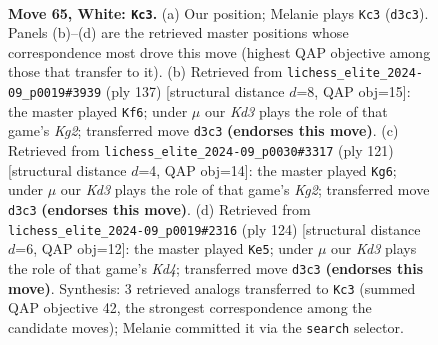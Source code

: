 \documentclass[11pt]{article}
\begin{document}
\clearpage

\begin{figure}[p]\centering
\begin{subfigure}{0.46\textwidth}\centering
\resizebox{\linewidth}{!}{%
\newchessgame
\chessboard[
  setfen={8/p6k/1p6/8/q1P5/3K4/8/8 w - - 2 65},
  showmover=false,
  pgfstyle=straightmove, color=movearrow, markmove={d3-c3}
]}
\caption{}
\end{subfigure}\hfill
\begin{subfigure}{0.46\textwidth}\centering
\resizebox{\linewidth}{!}{%
\newchessgame
\chessboard[
  setfen={2Q5/1P4k1/8/5p2/1K6/4P3/8/6B1 b - - 0 69},
  showmover=false,
  pgfstyle=straightmove, color=movearrow, markmove={g7-f6}
]}
\caption{}
\end{subfigure}
\\[4pt]
\begin{subfigure}{0.46\textwidth}\centering
\resizebox{\linewidth}{!}{%
\newchessgame
\chessboard[
  setfen={8/6k1/4Qp2/8/5PP1/8/6K1/8 b - - 1 61},
  showmover=false,
  pgfstyle=straightmove, color=movearrow, markmove={g7-g6}
]}
\caption{}
\end{subfigure}\hfill
\begin{subfigure}{0.46\textwidth}\centering
\resizebox{\linewidth}{!}{%
\newchessgame
\chessboard[
  setfen={6k1/5p2/2q4p/2P5/3K4/8/8/8 w - - 1 63},
  showmover=false,
  pgfstyle=straightmove, color=movearrow, markmove={d4-e5}
]}
\caption{}
\end{subfigure}
\caption{\textbf{Move 65, White: \texttt{Kc3}.} (a) Our position; Melanie plays \texttt{Kc3} (\texttt{d3c3}). Panels (b)--(d) are the retrieved master positions whose correspondence most drove this move (highest QAP objective among those that transfer to it). (b) Retrieved from \texttt{lichess\_elite\_2024-09\_p0019\#3939} (ply 137) [structural distance $d$=8, QAP obj=15]: the master played \texttt{Kf6}; under $\mu$ our \emph{Kd3} plays the role of that game's \emph{Kg2}; transferred move \texttt{d3c3} \textbf{(endorses this move)}. (c) Retrieved from \texttt{lichess\_elite\_2024-09\_p0030\#3317} (ply 121) [structural distance $d$=4, QAP obj=14]: the master played \texttt{Kg6}; under $\mu$ our \emph{Kd3} plays the role of that game's \emph{Kg2}; transferred move \texttt{d3c3} \textbf{(endorses this move)}. (d) Retrieved from \texttt{lichess\_elite\_2024-09\_p0019\#2316} (ply 124) [structural distance $d$=6, QAP obj=12]: the master played \texttt{Ke5}; under $\mu$ our \emph{Kd3} plays the role of that game's \emph{Kd4}; transferred move \texttt{d3c3} \textbf{(endorses this move)}. Synthesis: 3 retrieved analogs transferred to \texttt{Kc3} (summed QAP objective 42, the strongest correspondence among the candidate moves); Melanie committed it via the \texttt{search} selector.}
\label{fig:thought-m128}
\end{figure}
\end{document}
